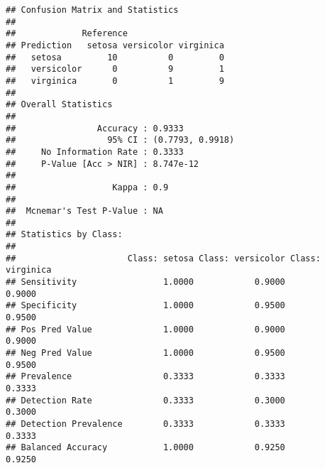 \documentclass[
]{article}
\newenvironment{Shaded}{\begin{snugshade}}{\end{snugshade}}
\newcommand{\AttributeTok}[1]{\textcolor[rgb]{0.77,0.63,0.00}{#1}}
\newcommand{\CommentTok}[1]{\textcolor[rgb]{0.56,0.35,0.01}{\textit{#1}}}
\newcommand{\FunctionTok}[1]{\textcolor[rgb]{0.00,0.00,0.00}{#1}}
\newcommand{\NormalTok}[1]{#1}
\newcommand{\OtherTok}[1]{\textcolor[rgb]{0.56,0.35,0.01}{#1}}
\newcommand{\SpecialCharTok}[1]{\textcolor[rgb]{0.00,0.00,0.00}{#1}}
\begin{document}
\begin{verbatim}
## Confusion Matrix and Statistics
## 
##             Reference
## Prediction   setosa versicolor virginica
##   setosa         10          0         0
##   versicolor      0          9         1
##   virginica       0          1         9
## 
## Overall Statistics
##                                           
##                Accuracy : 0.9333          
##                  95% CI : (0.7793, 0.9918)
##     No Information Rate : 0.3333          
##     P-Value [Acc > NIR] : 8.747e-12       
##                                           
##                   Kappa : 0.9             
##                                           
##  Mcnemar's Test P-Value : NA              
## 
## Statistics by Class:
## 
##                      Class: setosa Class: versicolor Class: virginica
## Sensitivity                 1.0000            0.9000           0.9000
## Specificity                 1.0000            0.9500           0.9500
## Pos Pred Value              1.0000            0.9000           0.9000
## Neg Pred Value              1.0000            0.9500           0.9500
## Prevalence                  0.3333            0.3333           0.3333
## Detection Rate              0.3333            0.3000           0.3000
## Detection Prevalence        0.3333            0.3333           0.3333
## Balanced Accuracy           1.0000            0.9250           0.9250
\end{verbatim}

\begin{Shaded}
\end{Shaded}
\end{document}
